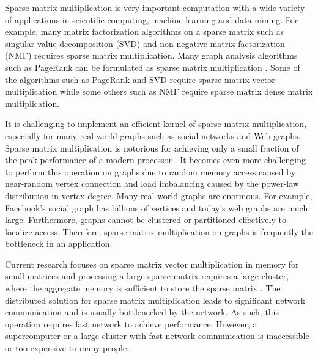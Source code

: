Sparse matrix multiplication is very important computation with a wide variety
of applications in scientific computing, machine learning and data mining.
For example, many matrix factorization algorithms on a sparse matrix such as
singular value decomposition (SVD) \cite{svd} and non-negative matrix
factorization (NMF) \cite{nmf} requires sparse matrix multiplication.
Many graph analysis algorithms such as PageRank \cite{pagerank} can be
formulated as sparse matrix multiplication \cite{Mattson13}. Some of
the algorithms such as PageRank and SVD require sparse matrix vector
multiplication while some others such as NMF require sparse matrix dense
matrix multiplication.


It is challenging to implement an efficient kernel of sparse matrix
multiplication, especially for many real-world graphs such as social networks
and Web graphs. Sparse matrix multiplication is notorious for achieving only
a small fraction of the peak performance of a modern processor \cite{Williams07}.
It becomes even more challenging to perform this operation on graphs due to
random memory access caused by near-random vertex connection and load imbalancing
caused by the power-law distribution in vertex degree. Many real-world graphs
are enormous. For example, Facebook's social graph has billions of vertices
and today's web graphs are much large. Furthermore, graphs cannot be
clustered or partitioned effectively \cite{leskovec} to localize access.
Therefore, sparse matrix multiplication on graphs is frequently the bottleneck
in an application.

Current research focuses on sparse matrix vector multiplication in memory for
small matrices and processing a large sparse matrix requires a large cluster,
where the aggregate memory is sufficient to store the sparse matrix \cite{}.
The distributed solution for sparse matrix multiplication leads to significant
network communication and is usually bottlenecked by the network.
As such, this operation requires fast network to achieve performance.
However, a supercomputer or a large cluster with fast network communication
is inaccessible or too expensive to many people.




